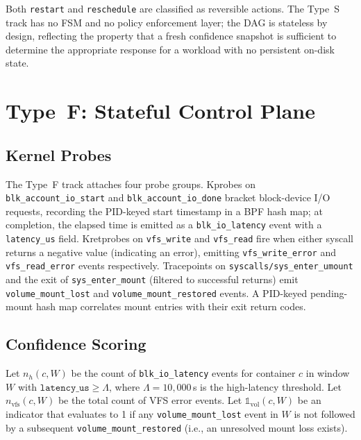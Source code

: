 \documentclass[runningheads]{llncs}
\begin{document}
Both \texttt{restart} and \texttt{reschedule} are classified as
reversible actions. The Type~S track has no FSM and no policy
enforcement layer; the DAG is stateless by design, reflecting the
property that a fresh confidence snapshot is sufficient to determine
the appropriate response for a workload with no persistent on-disk state.

\section{Type~F: Stateful Control Plane}
\label{sec:typef}

\subsection{Kernel Probes}

The Type~F track attaches four probe groups. Kprobes on
\texttt{blk\_account\_io\_start} and \texttt{blk\_account\_io\_done}
bracket block-device I/O requests, recording the PID-keyed start
timestamp in a BPF hash map; at completion, the elapsed time is emitted
as a \texttt{blk\_io\_latency} event with a \texttt{latency\_us} field.
Kretprobes on \texttt{vfs\_write} and \texttt{vfs\_read} fire when
either syscall returns a negative value (indicating an error), emitting
\texttt{vfs\_write\_error} and \texttt{vfs\_read\_error} events
respectively. Tracepoints on \texttt{syscalls/sys\_enter\_umount} and
the exit of \texttt{sys\_enter\_mount} (filtered to successful returns)
emit \texttt{volume\_mount\_lost} and \texttt{volume\_mount\_restored}
events. A PID-keyed pending-mount hash map correlates mount entries with
their exit return codes.

\subsection{Confidence Scoring}

Let $n_h(c,W)$ be the count of \texttt{blk\_io\_latency} events for
container $c$ in window $W$ with $\texttt{latency\_us} \geq \Lambda$,
where $\Lambda = 10{,}000$\,\textmu s is the high-latency threshold.
Let $n_{\mathrm{vfs}}(c,W)$ be the total count of VFS error events.
Let $\mathbb{1}_{\mathrm{vol}}(c,W)$ be an indicator that evaluates
to 1 if any \texttt{volume\_mount\_lost} event in $W$ is not followed
by a subsequent \texttt{volume\_mount\_restored} (i.e., an unresolved
mount loss exists).
\end{document}
